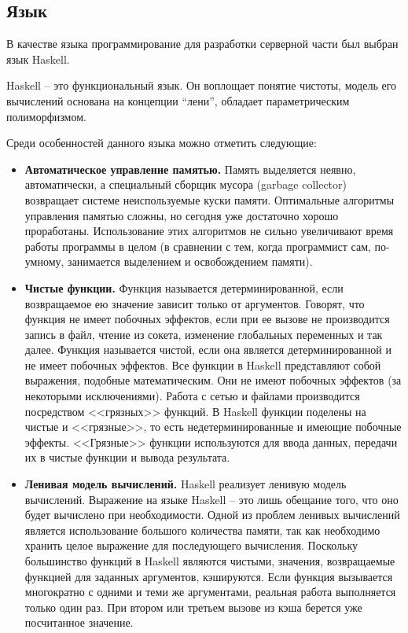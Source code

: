 \subsection{Язык}
В качестве языка программирование для разработки серверной части был выбран язык Haskell. 

Haskell – это функциональный язык. Он воплощает понятие чистоты, модель его вычислений основана на концепции “лени”, обладает параметрическим полиморфизмом. 

Среди особенностей данного языка можно отметить следующие:
\begin{itemize}
	\item \textbf{Автоматическое управление памятью.} Память выделяется неявно, автоматически, а специальный сборщик мусора (garbage collector) возвращает системе неиспользуемые куски памяти. Оптимальные алгоритмы управления памятью сложны, но сегодня уже достаточно хорошо проработаны. Использование этих алгоритмов не сильно увеличивают время работы программы в целом (в сравнении с тем, когда программист сам, по-умному, занимается выделением и освобождением памяти).
	
	\item \textbf{Чистые функции.} Функция называется детерминированной, если возвращаемое ею значение зависит только от аргументов. Говорят, что функция не имеет побочных эффектов, если при ее вызове не производится запись в файл, чтение из сокета, изменение глобальных переменных и так далее. Функция называется чистой, если она является детерминированной и не имеет побочных эффектов. Все функции в Haskell представляют собой выражения, подобные математическим. Они не имеют побочных эффектов (за некоторыми исключениями). Работа с сетью и файлами производится посредством <<грязных>> функций. В Haskell функции поделены на чистые и <<грязные>>, то есть недетерминированные и имеющие побочные эффекты. <<Грязные>> функции используются для ввода данных, передачи их в чистые функции и вывода результата.
	
	\item \textbf{Ленивая модель вычислений.} Haskell реализует ленивую модель вычислений. Выражение на языке Haskell – это лишь обещание того, что оно будет вычислено при необходимости. Одной из проблем ленивых вычислений является использование большого количества памяти, так как необходимо хранить целое выражение для последующего вычисления. Поскольку большинство функций в Haskell являются чистыми, значения, возвращаемые функцией для заданных аргументов, кэшируются. Если функция вызывается многократно с одними и теми же аргументами, реальная работа выполняется только один раз. При втором или третьем вызове из кэша берется уже посчитанное значение.
	

\end{itemize}
